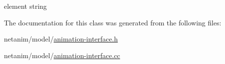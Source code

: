 element string 



The documentation for this class was generated from the following files\+:\begin{DoxyCompactItemize}
\item 
netanim/model/\hyperlink{animation-interface_8h}{animation-\/interface.\+h}\item 
netanim/model/\hyperlink{animation-interface_8cc}{animation-\/interface.\+cc}\end{DoxyCompactItemize}
